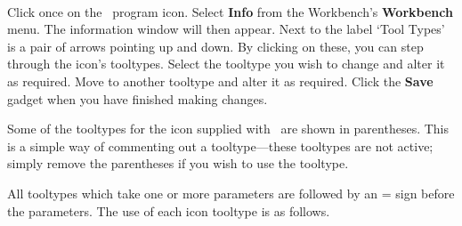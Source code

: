 \\
Click once on the \amplot\ program icon. Select {\bf Info} from the 
Workbench's {\bf Workbench} menu. The information window will then appear. 
Next to the label `Tool Types' is a pair of arrows pointing up and down. By 
clicking on these, you can step through the icon's tooltypes. Select the tooltype
you wish to change and alter it as required. Move to another tooltype and alter it as 
required. Click the {\bf Save} gadget when you have finished making changes.
\vspace{1em}

Some of the tooltypes for the icon supplied with \amplot\ are shown in parentheses. 
This is a simple way of commenting out a tooltype---these tooltypes are not active; 
simply remove the parentheses if you wish to use the tooltype.

All tooltypes which take one or more parameters are followed by an = sign before the
parameters. The use of each icon tooltype is as follows.

